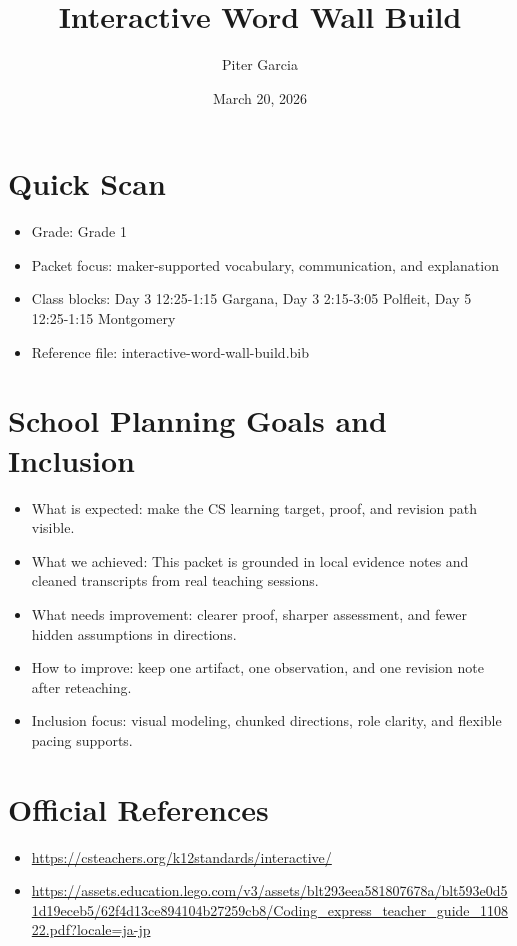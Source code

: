 \documentclass[11pt]{article}
\title{Interactive Word Wall Build}
\author{Piter Garcia}
\date{March 20, 2026}
\begin{document}
\maketitle
\section*{Quick Scan}
\begin{itemize}[leftmargin=*]
\item Grade: Grade 1
\item Packet focus: maker-supported vocabulary, communication, and explanation
\item Class blocks: Day 3 12:25-1:15 Gargana, Day 3 2:15-3:05 Polfleit, Day 5 12:25-1:15 Montgomery
\item Reference file: interactive-word-wall-build.bib
\end{itemize}
\section*{School Planning Goals and Inclusion}
\begin{itemize}[leftmargin=*]
\item What is expected: make the CS learning target, proof, and revision path visible.
\item What we achieved: This packet is grounded in local evidence notes and cleaned transcripts from real teaching sessions.
\item What needs improvement: clearer proof, sharper assessment, and fewer hidden assumptions in directions.
\item How to improve: keep one artifact, one observation, and one revision note after reteaching.
\item Inclusion focus: visual modeling, chunked directions, role clarity, and flexible pacing supports.
\end{itemize}
\section*{Official References}
\begin{itemize}[leftmargin=*]
\item \url{https://csteachers.org/k12standards/interactive/}
\item \url{https://assets.education.lego.com/v3/assets/blt293eea581807678a/blt593e0d51d19eceb5/62f4d13ce894104b27259cb8/Coding_express_teacher_guide_110822.pdf?locale=ja-jp}
\end{itemize}
\end{document}
